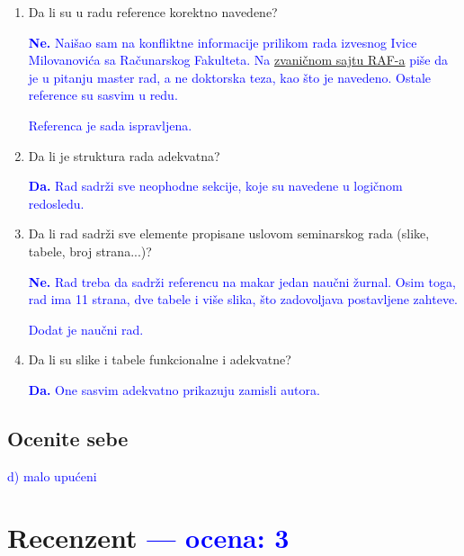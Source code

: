 \documentclass[a4paper]{report}
\newcommand{\odgovor}[1]{\textcolor{blue}{#1}}
\begin{document}
\begin{enumerate}
\item Da li su u radu reference korektno navedene?

\odgovor{\textbf{Ne.} Naišao sam na konfliktne informacije prilikom rada izvesnog Ivice Milovanovića sa Računarskog Fakulteta. Na \href{\underline{https://www.raf.edu.rs/en/component/k2/item/5768-milovanovic-ivica}}{zvaničnom sajtu RAF-a} piše da je u pitanju master rad, a ne doktorska teza, kao što je navedeno. Ostale reference su sasvim u redu.}


\odgovor{Referenca je sada ispravljena.}


\item Da li je struktura rada adekvatna?

\odgovor{\textbf{Da.} Rad sadrži sve neophodne sekcije, koje su navedene u logičnom redosledu.}

\item Da li rad sadrži sve elemente propisane uslovom seminarskog rada (slike, tabele, broj strana...)?

\odgovor{\textbf{Ne.} Rad treba da sadrži referencu na makar jedan naučni žurnal. Osim toga, rad ima 11 strana, dve tabele i više slika, što zadovoljava postavljene zahteve.}

\odgovor{Dodat je naučni rad.}

\item Da li su slike i tabele funkcionalne i adekvatne?

\odgovor{\textbf{Da.} One sasvim adekvatno prikazuju zamisli autora.}

\end{enumerate}

\section{Ocenite sebe}
\odgovor{d) malo upućeni}


\chapter{Recenzent \odgovor{--- ocena: 3} }
\end{document}
